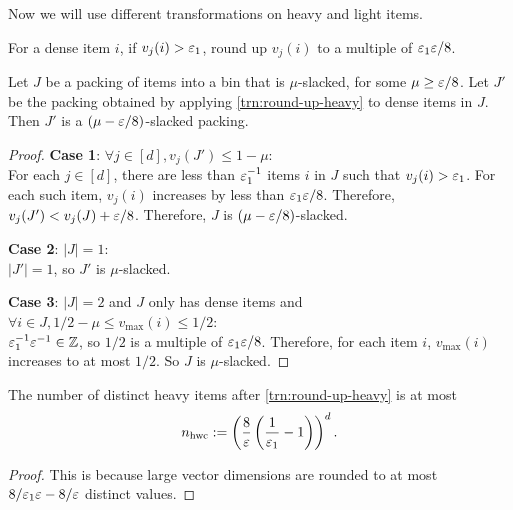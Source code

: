 Now we will use different transformations on heavy and light items.

\begin{transformation}
\label{trn:round-up-heavy}
For a dense item $i$, if $v_j(i) > \varepsilon_1$, round up $v_j(i)$ to a multiple of $\varepsilon_1\varepsilon/8$.
\end{transformation}
\begin{lemma}
\label{lem:round-up-heavy}
Let $J$ be a packing of items into a bin that is $\mu$-slacked, for some $\mu \ge \varepsilon/8$.
Let $J'$ be the packing obtained by applying \cref{trn:round-up-heavy}
to dense items in $J$. Then $J'$ is a $(\mu-\varepsilon/8)$-slacked packing.
\end{lemma}
\begin{proof}
\textbf{Case 1}: $\forall j \in [d], v_j(J') \le 1-\mu$:\\
For each $j \in [d]$, there are less than $\varepsilon_1^{-1}$ items $i$ in $J$
such that $v_j(i) > \varepsilon_1$. For each such item, $v_j(i)$ increases by less than $\varepsilon_1\varepsilon/8$.
Therefore, $v_j(J') < v_j(J) + \varepsilon/8$. Therefore, $J$ is $(\mu - \varepsilon/8)$-slacked.

\textbf{Case 2}: $|J| = 1$:\\
$|J'|=1$, so $J'$ is $\mu$-slacked.

\textbf{Case 3}: $|J| = 2$ and $J$ only has dense items
and $\forall i \in J, 1/2 - \mu \le v_{\max}(i) \le 1/2$:\\
$\varepsilon_1^{-1}\varepsilon^{-1} \in \mathbb{Z}$, so $1/2$ is a multiple of $\varepsilon_1\varepsilon/8$.
Therefore, for each item $i$, $v_{\max}(i)$ increases to at most $1/2$.
So $J$ is $\mu$-slacked.
\end{proof}

\begin{lemma}
\label{lem:round-up-heavy-n}
The number of distinct heavy items after \cref{trn:round-up-heavy} is at most
\[ n_{\mathrm{hwc}} := \left(\frac{8}{\varepsilon}\left(\frac{1}{\varepsilon_1}-1\right)\right)^d. \]
\end{lemma}
\begin{proof}
This is because large vector dimensions are rounded to at most
$8/\varepsilon_1\varepsilon - 8/\varepsilon$ distinct values.
\end{proof}

